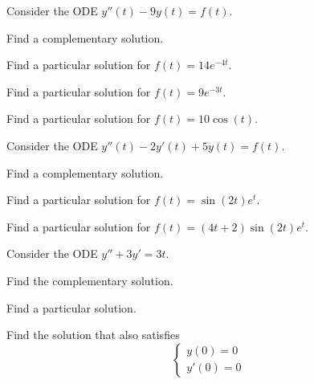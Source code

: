 \question \label{2nd:ode1}
	Consider the ODE \quad $y''(t) -9y(t) = f(t)$.
\begin{parts}
	\item Find a complementary solution.
	\item Find a particular solution for $f(t) = 14 e^{-4t}$.
	\item Find a particular solution for $f(t) = 9 e^{-3t}$.
	\item Find a particular solution for $f(t) = 10\cos(t)$.
\end{parts}

\bookonlynewpage

\question \label{2nd:ode2}
	Consider the ODE \quad $y''(t) -2y'(t)+5y(t) = f(t)$. %
\begin{parts}
	\item Find a complementary solution.
	\item Find a particular solution for $f(t) = \sin(2t)e^t$.
	\item Find a particular solution for $f(t) = (4t+2)\sin(2t)e^t$.
\end{parts}




\bookonlynewpage


\question \label{2nd:ode3}
	Consider the ODE \quad $y'' + 3y' = 3t$.
\begin{parts}
	\item Find the complementary solution.
	\item Find a particular solution.
	\item Find the solution that also satisfies
	$$ \begin{cases}
		y(0)=0 \\
		y'(0)=0
	\end{cases}$$
\end{parts}


